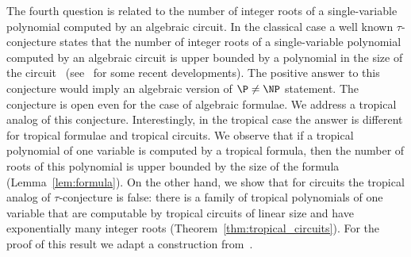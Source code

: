 \documentclass[11pt]{article}
\begin{document}
The fourth question is related to the number of integer roots of a single-variable polynomial computed by an algebraic circuit. In the classical case a well known $\tau$-conjecture states that the number of integer roots of a single-variable polynomial computed by an algebraic circuit is upper bounded by a polynomial in the size of the circuit~\cite{ShubS95,Smale98,Blum98} (see~\cite{KoiranPT15,KoiranPTT15} for some recent developments). The positive answer to this conjecture would imply an algebraic version of $\P \neq \NP$ statement. The conjecture is open even for the case of algebraic formulae. We address a tropical analog of this conjecture. Interestingly, in the tropical case the answer is different for tropical formulae and tropical circuits. We observe that if a tropical polynomial of one variable is computed by a tropical formula, then the number of roots of this polynomial is upper bounded by the size of the formula (Lemma~\ref{lem:formula}). On the other hand, we show that for circuits the tropical analog of $\tau$-conjecture is false: there is a family of tropical polynomials of one variable that are computable by tropical circuits of linear size and have exponentially many integer roots (Theorem~\ref{thm:tropical_circuits}). For the proof of this result we adapt a construction from~\cite{montufar2014}.


\end{document}
